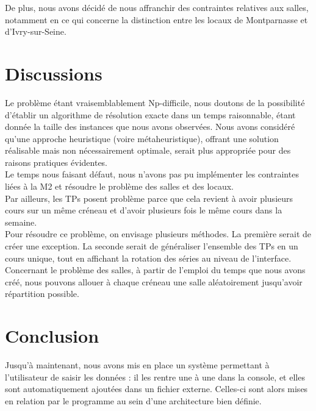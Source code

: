 \documentclass[12pt,a4paper,french]{article}
\begin{document}
De plus, nous avons décidé de nous affranchir des contraintes relatives aux salles, notamment en ce qui concerne la distinction entre les locaux de Montparnasse et d'Ivry-sur-Seine.\\

\newpage



\section{Discussions}

Le problème étant vraisemblablement Np-difficile, nous doutons de la possibilité d'établir un algorithme de résolution exacte dans un temps raisonnable, étant donnée la taille des instances que nous avons observées. Nous avons considéré qu'une approche heuristique (voire métaheuristique), offrant une solution réalisable mais non nécessairement optimale, serait plus appropriée pour des raisons pratiques évidentes.\\

Le temps nous faisant défaut, nous n'avons pas pu implémenter les contraintes liées à la M2 et résoudre le problème des salles et des locaux.\\

Par ailleurs, les TPs posent problème parce que cela revient à avoir plusieurs cours sur un même créneau et d'avoir plusieurs fois le même cours dans la semaine.\\

Pour résoudre ce problème, on envisage plusieurs méthodes. La première serait de créer une exception. La seconde serait de généraliser l'ensemble des TPs en un cours unique, tout en affichant la rotation des séries au niveau de l'interface.\\

Concernant le problème des salles, à partir de l'emploi du temps que nous avons créé, nous pouvons allouer à chaque créneau une salle aléatoirement jusqu'avoir répartition possible.


\newpage
\section{Conclusion}

Jusqu'à maintenant, nous avons mis en place un système permettant à l'utilisateur de saisir les données : il les rentre une à une dans la console, et elles sont automatiquement ajoutées dans un fichier externe. Celles-ci sont alors mises en relation par le programme au sein d'une architecture bien définie.\\
\end{document}
